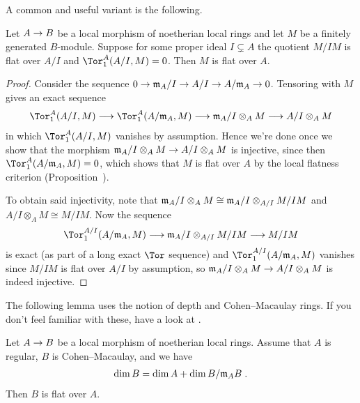 \documentclass[a4paper,parskip=half,numbers=enddot, DIV=12]{scrreprt}
\begin{document}
A common and useful variant is the following.
\begin{cor}
	Let $A\morphism B$ be a local morphism of noetherian local rings and let $M$ be a finitely generated $B$-module. Suppose for some proper ideal $I\subsetneq A$ the quotient $M/IM$ is flat over $A/I$ and $\Tor_1^A(A/I,M)=0$. Then $M$ is flat over $A$.
\end{cor}
\begin{proof}
	Consider the sequence $0\morphism\mm_A/I\morphism A/I\morphism A/\mm_A\morphism 0$. Tensoring with $M$ gives an exact sequence
	\begin{align*}
		\Tor_1^A(A/I,M)\morphism \Tor_1^A(A/\mm_A,M)\morphism \mm_A/I\otimes_AM\morphism A/I\otimes_AM
	\end{align*}
	in which $\Tor_1^A(A/I,M)$ vanishes by assumption. Hence we're done once we show that the morphism $\mm_A/I\otimes_AM\morphism A/I\otimes_AM$ is injective, since then $\Tor_1^A(A/\mm_A,M)=0$, which shows that $M$ is flat over $A$ by the local flatness criterion (Proposition~).
	
	To obtain said injectivity, note that $\mathfrak{m}_A/I\otimes_AM\cong \mathfrak{m}_A/I\otimes_{A/I}M/IM$ and $A/I\otimes_AM\cong M/IM$. Now the sequence
	\begin{align*}
		\Tor_1^{A/I}(A/\mm_A,M)\morphism \mm_A/I\otimes_{A/I}M/IM\morphism M/IM
	\end{align*}
	is exact (as part of a long exact $\Tor$ sequence) and $\Tor_1^{A/I}(A/\mm_A,M)$ vanishes since $M/IM$ is flat over $A/I$ by assumption, so $\mm_A/I\otimes_AM\morphism A/I\otimes_AM$ is indeed injective.
\end{proof}
The following lemma uses the notion of depth and Cohen--Macaulay rings. If you don't feel familiar with these, have a look at \cite[Section~2.3 and 2.4]{homalg}.
\begin{lem}
	Let $A\morphism B$ be a local morphism of noetherian local rings. Assume that $A$ is regular, $B$ is Cohen--Macaulay, and we have
	\begin{align*}
		\dim B=\dim A+\dim B/\mathfrak{m}_AB\;.
	\end{align*}
	Then $B$ is flat over $A$.
\end{lem}
\end{document}
